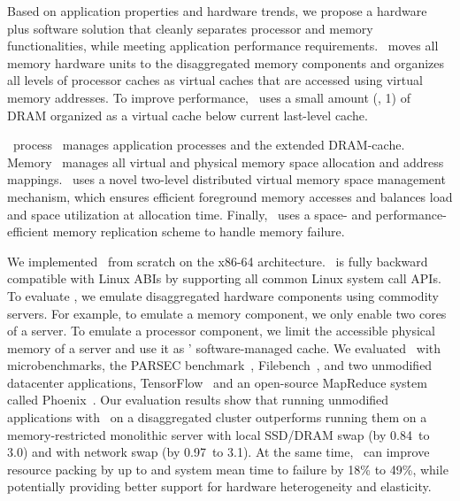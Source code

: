 \documentclass[10pt,times,twocolumn]{z2-article}
\begin{document}
Based on application properties and hardware trends, 
we propose a hardware plus software solution that cleanly separates processor and memory functionalities,
while meeting application performance requirements.
\lego\ moves all memory hardware units to the disaggregated memory components
and organizes all levels of processor caches as virtual caches that are accessed using virtual memory addresses. 
To improve performance, \lego\ uses a small amount (\eg, 1\GB) of DRAM
organized as a virtual cache below current last-level cache.

\lego\ process \microos\ manages application processes and the extended DRAM-cache.
Memory \microos\ manages all virtual and physical memory space allocation and address mappings. 
\lego\ uses a novel two-level distributed virtual memory space management mechanism,
which ensures efficient foreground memory accesses and balances load and space utilization at allocation time.
Finally, \lego\ uses a space- and performance-efficient memory replication scheme to handle memory failure.

We implemented \lego\ from scratch on the x86-64 architecture.
\lego\ is fully backward compatible with Linux ABIs
by supporting all common Linux system call APIs.
To evaluate \lego, we emulate disaggregated hardware components using commodity servers.
For example, to emulate a memory component, we only enable two cores of a server.
To emulate a processor component, we limit the accessible physical memory of a server
and use it as \lego{}' software-managed cache. 
We evaluated \lego\ with microbenchmarks, the PARSEC benchmark~\cite{PARSEC}, Filebench~\cite{Filebench},
and two unmodified datacenter applications, TensorFlow~\cite{TensorFlow}
and an open-source MapReduce system called Phoenix~\cite{Ranger07-HPCA}.
Our evaluation results show that running unmodified applications with \lego\ on a disaggregated cluster 
outperforms running them on a memory-restricted monolithic server with local SSD/DRAM swap (by 0.84\x\ to 3.0\x) 
and with network swap (by 0.97\x\ to 3.1\x). 
At the same time, \lego\ can improve resource packing by up to 
and system mean time to failure by 18\% to 49\%,
while potentially providing better support for hardware heterogeneity and elasticity.
\end{document}
